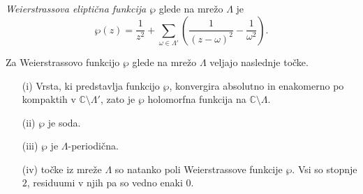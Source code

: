 \documentclass[mat1]{fmfdelo}
\newcommand{\C}{\mathbb C}
\newcommand{\om}{\omega}
\theoremstyle{definition}
\begin{document}
\begin{definicija}
    \emph{Weierstrassova eliptična funkcija $\wp$} glede na mrežo $\Lambda$ je
    \[
        \wp(z) = \frac{1}{z^2} + \sum_{\om\in\Lambda'}\left(\frac{1}{(z-\om)^2} - \frac{1}{\om^2}\right).
    \]
\end{definicija}

\begin{trditev}
    \label{lastnosti wp}
    Za Weierstrassovo funkcijo $\wp$ glede na mrežo $\Lambda$ veljajo naslednje točke.
    \begin{itemize}
        \item[(i)] Vrsta, ki predstavlja funkcijo $\wp$, konvergira absolutno in enakomerno po kompaktih v $\C\setminus\Lambda'$, zato je $\wp$ holomorfna funkcija na $\C \setminus \Lambda$.
        \item[(ii)] $\wp$ je soda.
        \item[(iii)] $\wp$ je $\Lambda$-periodična.
        \item[(iv)] točke iz mreže $\Lambda$ so natanko poli Weierstrassove funkcije $\wp$. Vsi so stopnje $2$, residuumi v njih pa so vedno enaki $0$. 
    \end{itemize}
\end{trditev}
\end{document}
